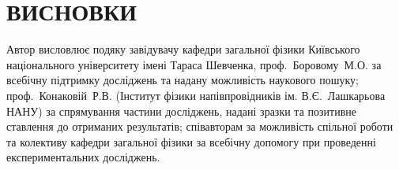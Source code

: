 \chapter*{\MakeUppercase{Висновки}}						%




Автор висловлює подяку
завідувачу кафедри загальної фізики Київського національного університету імені Тараса Шевченка,
проф.~Боровому~М.\:О. за всебічну підтримку досліджень та надану можливість наукового пошуку;
проф.~Конаковій~Р.\:В. (Інститут фізики напівпровідників ім. В.\:Є.~Лашкарьова НАНУ) за спрямування частини досліджень, надані зразки та позитивне ставлення до отриманих результатів;
співавторам за можливість спільної роботи
та колективу кафедри загальної фізики 
за всебічну допомогу при проведенні експериментальних досліджень.

